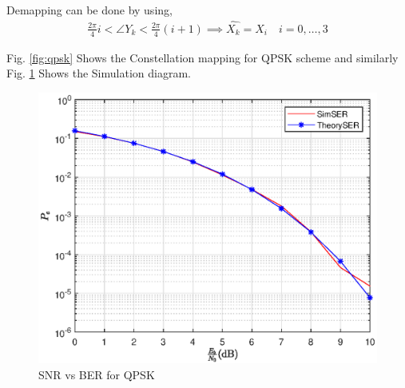 \documentclass[journal,12pt,twocolumn]{IEEEtran}
\begin{document}
Demapping can be done by using,
\begin{align}
\frac{2\pi }{4}i < \angle{Y_k} < \frac{2\pi }{4}(i+1) \implies \hat{X_k}=X_i \quad i=0,\dots,3
\end{align}

Fig. \ref{fig:qpsk} Shows the Constellation mapping for QPSK scheme and similarly Fig. \ref{fig:qpsk1} Shows the Simulation diagram.
\begin{figure}[!ht]
\begin{center}
\includegraphics[width=\columnwidth]{./figs/QPSK1}
\end{center}
\caption{SNR vs BER for QPSK}
\label{fig:qpsk1}
\end{figure}
\end{document}
